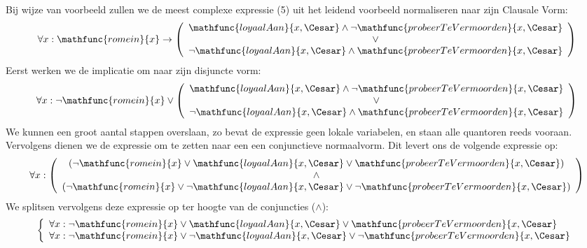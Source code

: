 \begin{leftbar}
Bij wijze van voorbeeld zullen we de meest complexe expressie (5) uit het leidend voorbeeld normaliseren naar zijn Clausale Vorm:
\begin{equation}
\forall x:\mathfunc{romein}{x}\rightarrow\left(\begin{array}{c}\mathfunc{loyaalAan}{x,\Cesar}\wedge\neg\mathfunc{probeerTeVermoorden}{x,\Cesar}\\\vee\\\neg\mathfunc{loyaalAan}{x,\Cesar}\wedge\mathfunc{probeerTeVermoorden}{x,\Cesar}\end{array}\right)
\end{equation}
Eerst werken we de implicatie om naar zijn disjuncte vorm:
\begin{equation}
\forall x:\neg\mathfunc{romein}{x}\vee\left(\begin{array}{c}\mathfunc{loyaalAan}{x,\Cesar}\wedge\neg\mathfunc{probeerTeVermoorden}{x,\Cesar}\\\vee\\\neg\mathfunc{loyaalAan}{x,\Cesar}\wedge\mathfunc{probeerTeVermoorden}{x,\Cesar}\end{array}\right)
\end{equation}
We kunnen een groot aantal stappen overslaan, zo bevat de expressie geen lokale variabelen, en staan alle quantoren reeds vooraan. Vervolgens dienen we de expressie om te zetten naar een een conjunctieve normaalvorm. Dit levert ons de volgende expressie op:
\begin{equation}
\forall x:\left(
\begin{array}{c}
\left(\neg\mathfunc{romein}{x}\vee\mathfunc{loyaalAan}{x,\Cesar}\vee\mathfunc{probeerTeVermoorden}{x,\Cesar}\right)\\\wedge\\\left(\neg\mathfunc{romein}{x}\vee\neg\mathfunc{loyaalAan}{x,\Cesar}\vee\neg\mathfunc{probeerTeVermoorden}{x,\Cesar}\right)
\end{array}\right)
\end{equation}
We splitsen vervolgens deze expressie op ter hoogte van de conjuncties ($\wedge$):
\begin{equation}
\left\{\begin{array}{l}
\forall x:\neg\mathfunc{romein}{x}\vee\mathfunc{loyaalAan}{x,\Cesar}\vee\mathfunc{probeerTeVermoorden}{x,\Cesar}\\
\forall x:\neg\mathfunc{romein}{x}\vee\neg\mathfunc{loyaalAan}{x,\Cesar}\vee\neg\mathfunc{probeerTeVermoorden}{x,\Cesar}
\end{array}\right.

\end{equation}
\end{leftbar}
